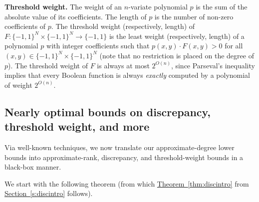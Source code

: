 \documentclass[11pt]{article}
\numberwithin{equation}{section}
\theoremstyle{definition}
\theoremstyle{plain}
\newcommand{\expref}[2]{\hyperref[#2]{#1~\ref{#2}}}
\newcommand{\bits}{\{-1,1\}}
\begin{document}
\medskip \noindent \textbf{Threshold weight.}
The weight of an $n$-variate polynomial $p$
is the sum of the absolute value of its coefficients. The length of $p$
is the number of non-zero coefficients of $p$.
The threshold weight (respectively, length) of $F \colon \bits^N \times \bits^N \to \bits$ is the least weight (respectively, length) of a polynomial 
$p$ with integer coefficients such that $p(x, y) \cdot F(x,y) > 0$ for all $(x, y) \in \bits^N \times \bits^N$ (note that
no restriction is placed on the degree of $p$). The threshold weight of $F$ is always at most $2^{O(n)}$,
since Parseval's inequality implies that every Boolean function is always \emph{exactly} computed
by a polynomial of weight $2^{O(n)}$. 


\subsection{Nearly optimal bounds on discrepancy, threshold weight, and more}
Via well-known techniques, we now translate our %
approximate-degree lower bounds into approximate-rank, discrepancy, and threshold-weight bounds %
in a black-box manner.

We start with the following theorem (from which \expref{Theorem}{thm:discintro} from \expref{Section}{s:discintro} follows).
\end{document}
